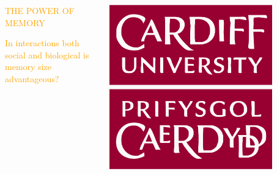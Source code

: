 \documentclass[usenames,dvipsnames,t]{beamer}
\begin{document}
\begin{columns}
    \begin{column}{.9\linewidth}
    \vspace{1cm}

    \centering
    \textcolor{orange}{\fontsize{100}{200} \selectfont THE POWER OF MEMORY}
    \vspace{0.5cm}

    \Large\textcolor{orange}{In interactions both social and biological is memory
    size advantageous?}
    \end{column}
    \begin{column}{.1\linewidth}
        \vspace{0.5cm}
    
            \includegraphics[width=0.8\textwidth]{static/cardiff_uni_logo}
        \end{column}
\end{columns}
\end{document}
